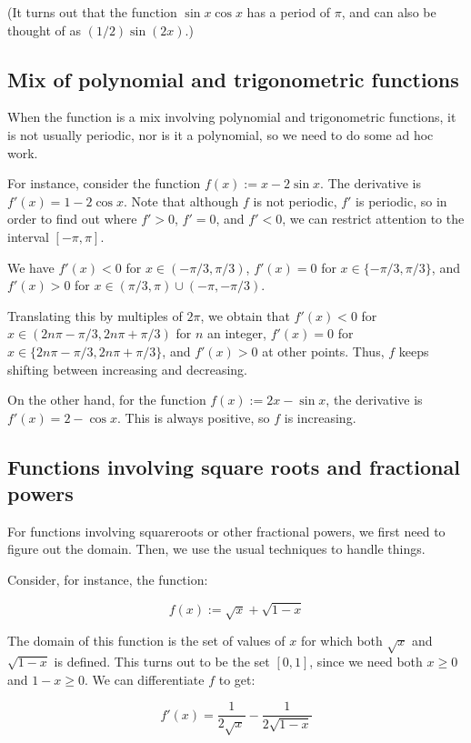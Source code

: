 \documentclass[10pt]{amsart}
\begin{document}
(It turns out that the function $\sin x \cos x$ has a period of $\pi$,
and can also be thought of as $(1/2) \sin(2x)$.)

\subsection{Mix of polynomial and trigonometric functions}

When the function is a mix involving polynomial and trigonometric
functions, it is not usually periodic, nor is it a polynomial, so we
need to do some ad hoc work.

For instance, consider the function $f(x) := x - 2 \sin x$. The
derivative is $f'(x) = 1 - 2\cos x$. Note that although $f$ is not
periodic, $f'$ is periodic, so in order to find out where $f' > 0$,
$f' = 0$, and $f' < 0$, we can restrict attention to the interval
$[-\pi,\pi]$.

We have $f'(x) < 0$ for $x \in (-\pi/3,\pi/3)$, $f'(x) = 0$ for $x \in
\{ -\pi/3,\pi/3\}$, and $f'(x) > 0$ for $x \in (\pi/3,\pi) \cup
(-\pi,-\pi/3)$.

Translating this by multiples of $2\pi$, we obtain that $f'(x) < 0$
for $x \in (2n\pi - \pi/3, 2n\pi + \pi/3)$ for $n$ an integer, $f'(x)
= 0$ for $x \in \{ 2n\pi - \pi/3, 2n\pi + \pi/3 \}$, and $f'(x) > 0$
at other points. Thus, $f$ keeps shifting between increasing and
decreasing.

On the other hand, for the function $f(x) := 2x - \sin x$, the
derivative is $f'(x) = 2 - \cos x$. This is always positive, so $f$ is
increasing.

\subsection{Functions involving square roots and fractional powers}

For functions involving squareroots or other fractional powers, we
first need to figure out the domain. Then, we use the usual techniques
to handle things.

Consider, for instance, the function:

$$f(x) := \sqrt{x} + \sqrt{1 - x}$$

The domain of this function is the set of values of $x$ for which both
$\sqrt{x}$ and $\sqrt{1 - x}$ is defined. This turns out to be the set
$[0,1]$, since we need both $x \ge 0$ and $1 - x \ge 0$. We can
differentiate $f$ to get:

$$f'(x) = \frac{1}{2\sqrt{x}} - \frac{1}{2\sqrt{1 - x}}$$
\end{document}
